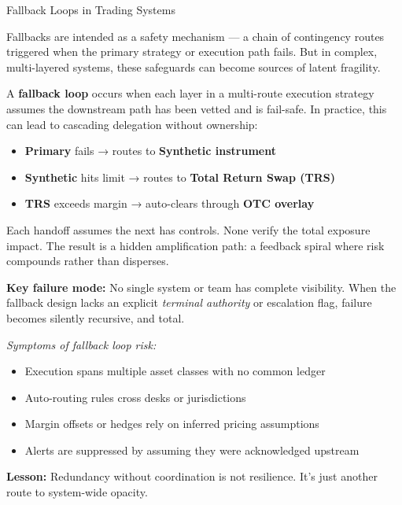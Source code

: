 \begin{TechnicalSidebar}{Fallback Loops in Trading Systems}

  Fallbacks are intended as a safety mechanism — a chain of contingency routes triggered when the primary strategy 
  or execution path fails. But in complex, multi-layered systems, these safeguards can become sources of latent 
  fragility.

  \medskip
  
  A \textbf{fallback loop} occurs when each layer in a multi-route execution strategy assumes the downstream path has 
  been vetted and is fail-safe. In practice, this can lead to cascading delegation without ownership:

  \medskip

  \begin{itemize}
    \item \textbf{Primary} fails → routes to \textbf{Synthetic instrument}
    \item \textbf{Synthetic} hits limit → routes to \textbf{Total Return Swap (TRS)}
    \item \textbf{TRS} exceeds margin → auto-clears through \textbf{OTC overlay}
  \end{itemize}

  \medskip
  
  Each handoff assumes the next has controls. None verify the total exposure impact. The result is a hidden amplification 
  path: a feedback spiral where risk compounds rather than disperses.

  \medskip
  
  \textbf{Key failure mode:} No single system or team has complete visibility. When the fallback design lacks an 
  explicit \textit{terminal authority} or escalation flag, failure becomes silently recursive, and total.

  \medskip
  
  \textit{Symptoms of fallback loop risk:}

  \medskip

  \begin{itemize}
    \item Execution spans multiple asset classes with no common ledger
    \item Auto-routing rules cross desks or jurisdictions
    \item Margin offsets or hedges rely on inferred pricing assumptions
    \item Alerts are suppressed by assuming they were acknowledged upstream
  \end{itemize}

  \medskip
  
  \textbf{Lesson:} Redundancy without coordination is not resilience. It's just another route to system-wide opacity.

\end{TechnicalSidebar}


